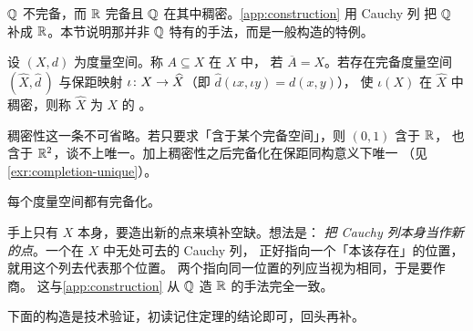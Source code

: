 \(\mathbb{Q}\) 不完备，而 \(\mathbb{R}\) 完备且 \(\mathbb{Q}\) 在其中稠密。\cref{app:construction} 用 Cauchy 列
把 \(\mathbb{Q}\) 补成 \(\mathbb{R}\)。本节说明那并非 \(\mathbb{Q}\) 特有的手法，而是一般构造的特例。

\begin{definition}[稠密与完备化]
  \label{def:completion}
  设 \((X,d)\) 为度量空间。称 \(A \subseteq X\) 在 \(X\) 中，
  若 \(\overline{A} = X\)。若存在完备度量空间 \((\widehat{X},\widehat{d}\,)\)
  与保距映射 \(\iota \colon X \to \widehat{X}\)（即 \(\widehat{d}(\iota x,\iota y)=d(x,y)\)），
  使 \(\iota(X)\) 在 \(\widehat{X}\) 中稠密，则称 \(\widehat{X}\) 为 \(X\) 的%
  。
\end{definition}

稠密性这一条不可省略。若只要求「含于某个完备空间」，则 \((0,1)\) 含于 \(\mathbb{R}\)，
也含于 \(\mathbb{R}^{2}\)，谈不上唯一。加上稠密性之后完备化在保距同构意义下唯一
（见\cref{exr:completion-unique}）。

\begin{theorem}[完备化定理]
  \label{thm:completion}
  每个度量空间都有完备化。
\end{theorem}

\begin{strategy}
  手上只有 \(X\) 本身，要造出新的点来填补空缺。想法是：
  \emph{把 Cauchy 列本身当作新的点}。一个在 \(X\) 中无处可去的 Cauchy 列，
  正好指向一个「本该存在」的位置，就用这个列去代表那个位置。
  两个指向同一位置的列应当视为相同，于是要作商。
  这与\cref{app:construction} 从 \(\mathbb{Q}\) 造 \(\mathbb{R}\) 的手法完全一致。
\end{strategy}

下面的构造是技术验证，初读记住定理的结论即可，回头再补。

